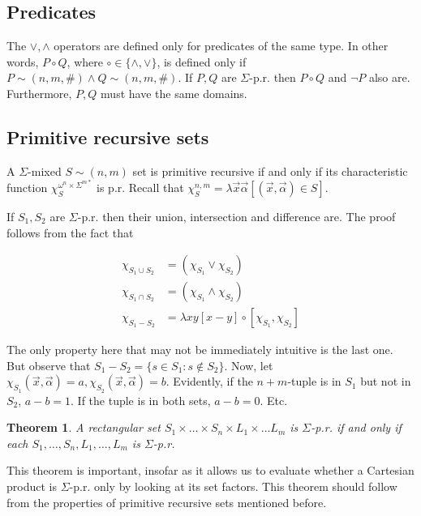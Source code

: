 \documentclass[a4paper, 12pt]{article}
\newtheorem{theorem}{Theorem}
\newtheorem{theorem}{Theorem}
\begin{document}
\subsection{Predicates}

The $\lor, \land$ operators are defined only for predicates of the same type. In
other words, $P \circ Q$, where $\circ \in \{\land, \lor\}$, is defined only if
$P \sim (n, m, \#) \land Q \sim (n, m, \#)$. If $P, Q$ are $\Sigma$-p.r. then $P
\circ Q$ and $\neg P$ also are. Furthermore, $P, Q$ must have the same domains.

\subsection{Primitive recursive sets}

A $\Sigma$-mixed $S \sim (n, m)$ set is primitive recursive if and only if its
characteristic function $\chi_S^{\omega^n \times \Sigma^{m*}}$ is p.r. Recall
that $\chi_S^{n, m} = \lambda
\overrightarrow{x}\overrightarrow{\alpha}[(\overrightarrow{x},
\overrightarrow{\alpha}) \in S]$.

If $S_1, S_2$ are $\Sigma$-p.r. then their union, intersection and difference
are. The proof follows from the fact that 

\begin{align*}
    \chi_{S_1 \cup S_2} &= \left( \chi_{S_1} \lor \chi_{S_2} \right) \\ 
    \chi_{S_1 \cap S_2} &= \left( \chi_{S_1} \land \chi_{S_2} \right) \\ 
    \chi_{S_1 - S_2} &= \lambda xy[x - y] \circ \left[ \chi_{S_1}, \chi_{S_2} \right] 
\end{align*}

The only property here that may not be immediately intuitive is the last one.
But observe that $S_1 - S_2 = \{s \in S_1 : s \not\in S_2\}$. Now, let
$\chi_{S_1}(\overrightarrow{x}, \overrightarrow{\alpha}) = a,
\chi_{S_2}(\overrightarrow{x}, \overrightarrow{\alpha}) = b$. Evidently, if the
$n+m$-tuple is in $S_1$ but not in $S_2$, $a - b = 1$. If the tuple is in both
sets, $a - b = 0$. Etc.

\begin{theorem}
    A rectangular set $S_1 \times  \ldots \times  S_n \times  L_1 \times  \ldots
    L_m$ is $\Sigma$-p.r. if and only if each $S_1, \ldots, S_n, L_1, \ldots,
    L_m$ is $\Sigma$-p.r.
\end{theorem}

This theorem is important, insofar as it allows us to evaluate whether a
Cartesian product is $\Sigma$-p.r. only by looking at its set factors. This
theorem should follow from the properties of primitive recursive sets mentioned
before.
\end{document}
